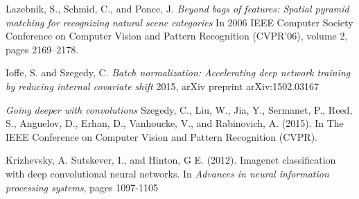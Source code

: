 \documentclass[12pt, a4paper]{report}
\begin{document}
\begin{thebibliography}{9}
	
	Lazebnik, S., Schmid, C., and Ponce, J.
	\textit{Beyond bags of features: Spatial pyramid matching for recognizing natural scene
	categories}
	In 2006 IEEE Computer Society Conference on Computer Vision	and Pattern Recognition (CVPR’06), volume 2, pages 2169–2178.
	
	Ioffe, S. and Szegedy, C.
	\textit{Batch normalization: Accelerating deep network training by reducing internal covariate shift}
	2015, arXiv	preprint arXiv:1502.03167
	
	\textit{Going deeper with convolutions}
	Szegedy, C., Liu, W., Jia, Y., Sermanet, P., Reed, S., Anguelov, D., Erhan, D., Vanhoucke, V., and Rabinovich, A. (2015). In The IEEE Conference on Computer Vision and Pattern Recognition (CVPR).
	
	Krizhevsky, A. Sutskever, I., and Hinton, G E. (2012). Imagenet classification with deep convolutional neural networks. In \textit{Advances in neural information processing systems}, pages 1097-1105
\end{thebibliography}
\end{document}
